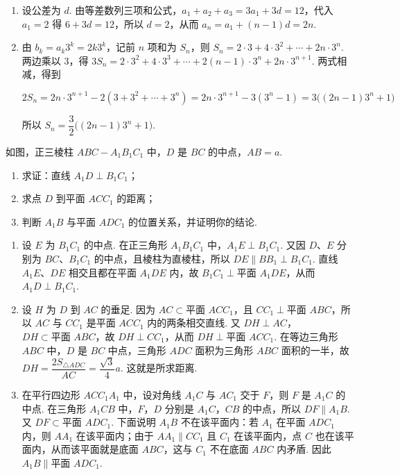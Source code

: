 \begin{solution}
\begin{enumerate}
\item 设公差为 \(d\). 由等差数列三项和公式，\(a_1+a_2+a_3=3a_1+3d=12\)，代入 \(a_1=2\) 得 \(6+3d=12\)，所以 \(d=2\)，从而 \(a_n=a_1+(n-1)d=2n\).
\item 由 \(b_k=a_k3^k=2k3^k\)，记前 \(n\) 项和为 \(S_n\)，则 \(S_n=2\cdot3+4\cdot3^2+\cdots+2n\cdot3^n\). 两边乘以 \(3\)，得 \(3S_n=2\cdot3^2+4\cdot3^3+\cdots+2(n-1)\cdot3^n+2n\cdot3^{n+1}\). 两式相减，得到

\[
2S_n=2n\cdot3^{n+1}-2(3+3^2+\cdots+3^n)=2n\cdot3^{n+1}-3(3^n-1)=3\bigl((2n-1)3^n+1\bigr)
\]

所以 \(S_n=\dfrac{3}{2}\bigl((2n-1)3^n+1\bigr)\).
\end{enumerate}
\end{solution}

\begin{problem}
如图，正三棱柱 \(ABC - A_1B_1C_1\) 中，\(D\) 是 \(BC\) 的中点，\(AB = a\).

\begin{enumerate}
\item 求证：直线 \(A_1D \perp B_1C_1\)；
\item 求点 \(D\) 到平面 \(ACC_1\) 的距离；
\item 判断 \(A_1B\) 与平面 \(ADC_1\) 的位置关系，并证明你的结论.
\end{enumerate}

\end{problem}

\begin{solution}
\begin{enumerate}
\item 设 \(E\) 为 \(B_1C_1\) 的中点. 在正三角形 \(A_1B_1C_1\) 中，\(A_1E\perp B_1C_1\). 又因 \(D\)、\(E\) 分别为 \(BC\)、\(B_1C_1\) 的中点，且棱柱为直棱柱，所以 \(DE\parallel BB_1\perp B_1C_1\). 直线 \(A_1E\)、\(DE\) 相交且都在平面 \(A_1DE\) 内，故 \(B_1C_1\perp\text{平面 }A_1DE\)，从而 \(A_1D\perp B_1C_1\).
\item 设 \(H\) 为 \(D\) 到 \(AC\) 的垂足. 因为 \(AC\subset\text{平面 }ACC_1\)，且 \(CC_1\perp\text{平面 }ABC\)，所以 \(AC\) 与 \(CC_1\) 是平面 \(ACC_1\) 内的两条相交直线. 又 \(DH\perp AC\)，\(DH\subset\text{平面 }ABC\)，故 \(DH\perp CC_1\)，从而 \(DH\perp\text{平面 }ACC_1\). 在等边三角形 \(ABC\) 中，\(D\) 是 \(BC\) 中点，三角形 \(ADC\) 面积为三角形 \(ABC\) 面积的一半，故 \(DH=\dfrac{2S_{\triangle ADC}}{AC}=\dfrac{\sqrt3}{4}a\). 这就是所求距离.
\item 在平行四边形 \(ACC_1A_1\) 中，设对角线 \(A_1C\) 与 \(AC_1\) 交于 \(F\)，则 \(F\) 是 \(A_1C\) 的中点. 在三角形 \(A_1CB\) 中，\(F\)，\(D\) 分别是 \(A_1C\)，\(CB\) 的中点，所以 \(DF\parallel A_1B\). 又 \(DF\subset\text{平面 }ADC_1\). 下面说明 \(A_1B\) 不在该平面内：若 \(A_1\) 在平面 \(ADC_1\) 内，则 \(AA_1\) 在该平面内；由于 \(AA_1\parallel CC_1\) 且 \(C_1\) 在该平面内，点 \(C\) 也在该平面内，从而该平面就是底面 \(ABC\)，这与 \(C_1\) 不在底面 \(ABC\) 内矛盾. 因此 \(A_1B\parallel\text{平面 }ADC_1\).
\end{enumerate}
\end{solution}

